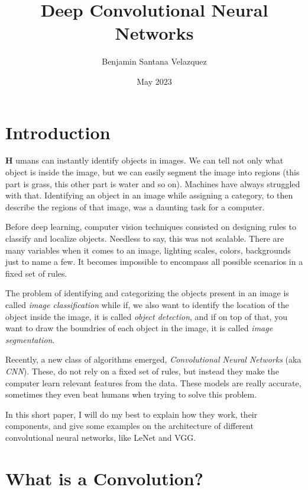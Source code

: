 \documentclass[10pt, twocolumn]{article}
\begin{document}
\title{Deep Convolutional Neural Networks}
\author{Benjamin Santana Velazquez}
\date{May 2023}

\maketitle

\newpage

\section{Introduction}
\lettrine[findent=2pt]{\textbf{H}}{ }umans can instantly identify objects in
images. We can tell not only what object is inside the image, but we can easily
segment the image into regions (this part is grass, this other part is water
and so on). Machines have always struggled with that. Identifying an object in
an image while assigning a category, to then describe the regions of that image,
was a daunting task for a computer.

Before deep learning, computer vision techniques consisted on designing rules
to classify and localize objects. Needless to say, this was not scalable. There
are many variables when it comes to an image, lighting scales, colors,
backgrounds just to name a few. It becomes impossible to encompass all
possible scenarios in a fixed set of rules.

The problem of identifying and categorizing the objects present in an image is
called \emph{image classification} while if, we also want to identify the
location of the object inside the image, it is called \emph{object detection},
and if on top of that, you want to draw the boundries of each object in the
image, it is called \emph{image segmentation}.

Recently, a new class of algorithms emerged, \emph{Convolutional Neural
Networks} (aka \emph{CNN}). These, do not rely on a fixed set of rules, but
instead they make the computer learn relevant features from the data. These
models are really accurate, sometimes they even beat humans when trying to
solve this problem.

In this short paper, I will do my best to explain how they work, their
components, and give some examples on the architecture of different
convolutional neural networks, like LeNet and VGG.

\section{What is a Convolution?}
\end{document}
